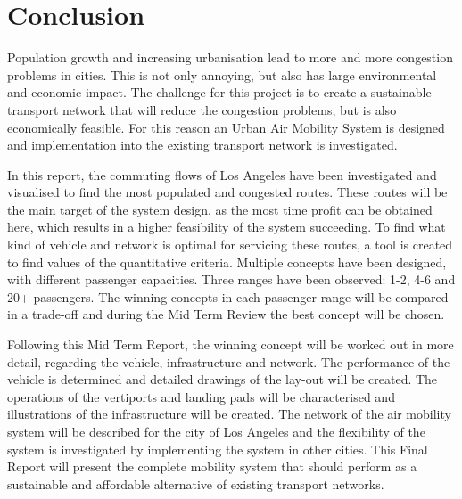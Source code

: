 \newpage
\chapter{Conclusion}
\label{Conclusion}

Population growth and increasing urbanisation lead to more and more congestion problems in cities. This is not only annoying, but also has large environmental and economic impact. The challenge for this project is to create a sustainable transport network that will reduce the congestion problems, but is also economically feasible. For this reason an Urban Air Mobility System is designed and implementation into the existing transport network is investigated. 

In this report, the commuting flows of Los Angeles have been investigated and visualised to find the most populated and congested routes. These routes will be the main target of the system design, as the most time profit can be obtained here, which results in a higher feasibility of the system succeeding. To find what kind of vehicle and network is optimal for servicing these routes, a tool is created to find values of the quantitative criteria. Multiple concepts have been designed, with different passenger capacities. Three ranges have been observed: 1-2, 4-6 and 20+ passengers. The winning concepts in each passenger range will be compared in a trade-off and during the Mid Term Review the best concept will be chosen. 

Following this Mid Term Report, the winning concept will be worked out in more detail, regarding the vehicle, infrastructure and network. The performance of the vehicle is determined and detailed drawings of the lay-out will be created. The operations of the vertiports and landing pads will be characterised and illustrations of the infrastructure will be created. The network of the air mobility system will be described for the city of Los Angeles and the flexibility of the system is investigated by implementing the system in other cities. This Final Report will present the complete mobility system that should perform as a sustainable and affordable alternative of existing transport networks. 